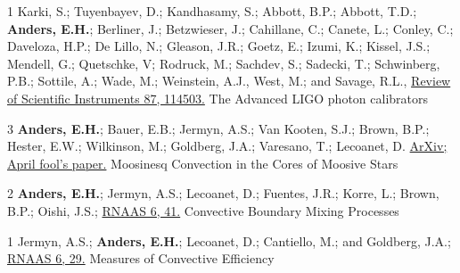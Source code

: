 	  {1}
	  {
			Karki, S.; Tuyenbayev, D.; Kandhasamy, S.; Abbott, B.P.; Abbott, T.D.; \textbf{Anders, E.H.};
			Berliner, J.; Betzwieser, J.; Cahillane, C.; Canete, L.; Conley, C.; Daveloza, H.P.; De Lillo, N.;
			Gleason, J.R.; Goetz, E.; Izumi, K.; Kissel, J.S.; Mendell, G.; Quetschke, V; Rodruck, M.; Sachdev, S.;
			Sadecki, T.; Schwinberg, P.B.; Sottile, A.; Wade, M.; Weinstein, A.J., West, M.; and Savage, R.L.,
			\href{https://aip.scitation.org/doi/10.1063/1.4967303}{Review of Scientific Instruments 87, 114503.}
	  }
	  {The Advanced LIGO photon calibrators}


	  {3}
	  {
		\textbf{Anders, E.H.}; Bauer, E.B.; Jermyn, A.S.; Van Kooten, S.J.; Brown, B.P.; Hester, E.W.; Wilkinson, M.; Goldberg, J.A.; Varesano, T.; Lecoanet, D.
        \href{https://arxiv.org/abs/2204.00002}{ArXiv; April fool's paper.}
	  }
	  {Moosinesq Convection in the Cores of Moosive Stars}

	  {2}
	  {
		\textbf{Anders, E.H.}; Jermyn, A.S.; Lecoanet, D.; Fuentes, J.R.; Korre, L.; Brown, B.P.; Oishi, J.S.; 
        \href{https://iopscience.iop.org/article/10.3847/2515-5172/ac5892}{RNAAS 6, 41.}
	  }
	  {Convective Boundary Mixing Processes}

\cvpub{}
	  {1}
	  {
		Jermyn, A.S.; \textbf{Anders, E.H.}; Lecoanet, D.; Cantiello, M.; and Goldberg, J.A.; 
        \href{https://iopscience.iop.org/article/10.3847/2515-5172/ac531e}{RNAAS 6, 29.}
	  }
	  {Measures of Convective Efficiency}


